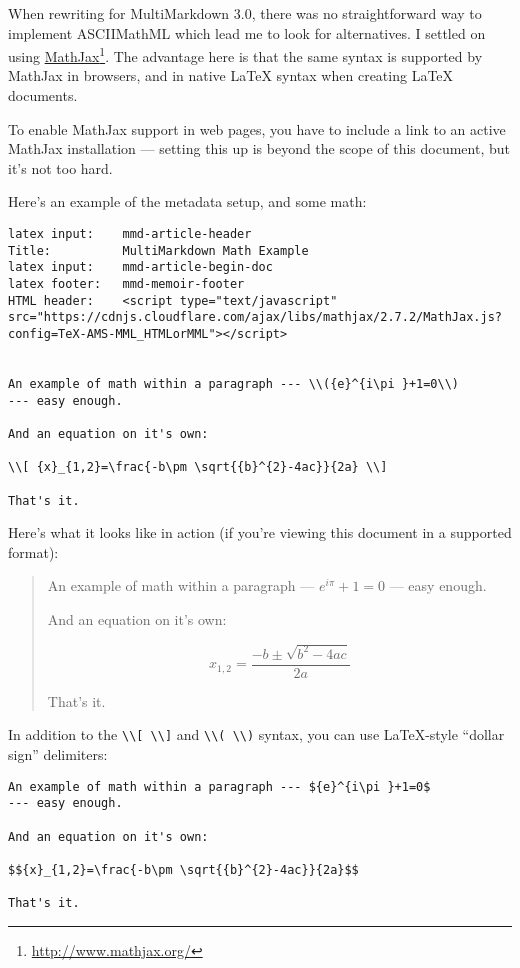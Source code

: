 When rewriting for MultiMarkdown 3.0, there was no straightforward way to
implement ASCIIMathML which lead me to look for alternatives. I settled on
using \href{http://www.mathjax.org/}{MathJax}\footnote{\href{http://www.mathjax.org/}{http:\slash \slash www.mathjax.org\slash }}. The advantage here is that the same syntax is supported by
MathJax in browsers, and in native LaTeX syntax when creating LaTeX documents.

To enable MathJax support in web pages, you have to include a link to an
active MathJax installation --- setting this up is beyond the scope of this
document, but it's not too hard.

Here's an example of the metadata setup, and some math:

\begin{verbatim}
latex input:	mmd-article-header  
Title:			MultiMarkdown Math Example  
latex input:	mmd-article-begin-doc  
latex footer:	mmd-memoir-footer  
HTML header:	<script type="text/javascript" src="https://cdnjs.cloudflare.com/ajax/libs/mathjax/2.7.2/MathJax.js?config=TeX-AMS-MML_HTMLorMML"></script>

		
An example of math within a paragraph --- \\({e}^{i\pi }+1=0\\)
--- easy enough.

And an equation on it's own:

\\[ {x}_{1,2}=\frac{-b\pm \sqrt{{b}^{2}-4ac}}{2a} \\]

That's it.
\end{verbatim}

Here's what it looks like in action (if you're viewing this document in a
supported format):

\begin{quote}
An example of math within a paragraph --- \({e}^{i\pi }+1=0\)
--- easy enough.

And an equation on it's own:

\[ {x}_{1,2}=\frac{-b\pm \sqrt{{b}^{2}-4ac}}{2a} \]

That's it.
\end{quote}

In addition to the \texttt{\textbackslash{}\textbackslash{}[ \textbackslash{}\textbackslash{}]} and \texttt{\textbackslash{}\textbackslash{}( \textbackslash{}\textbackslash{})} syntax, you can use LaTeX-style ``dollar sign'' delimiters:

\begin{verbatim}
An example of math within a paragraph --- ${e}^{i\pi }+1=0$
--- easy enough.

And an equation on it's own:

$${x}_{1,2}=\frac{-b\pm \sqrt{{b}^{2}-4ac}}{2a}$$

That's it.
\end{verbatim}

